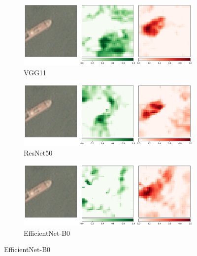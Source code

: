 \documentclass[11pt]{article}
\begin{document}
	\begin{figure}[H]
		\centering
		\caption{Occlusion-Based Attribution Maps}
		
		\begin{subfigure}[b]{0.45\textwidth}
			\centering
			\includegraphics[width=\linewidth]{assets/occlusion/vgg11_occlusion.png}
			\caption{VGG11}
		\end{subfigure}
		\hfill
		\begin{subfigure}[b]{0.45\textwidth}
			\centering
			\includegraphics[width=\linewidth]{assets/occlusion/resnet50_occlusion.png}
			\caption{ResNet50}
		\end{subfigure}

		
		\begin{subfigure}[b]{0.45\textwidth}
			\centering
			\includegraphics[width=\linewidth]{assets/occlusion/efficientnet_b0_occlusion.png}
			\caption{EfficientNet-B0}
		\end{subfigure}
	\end{figure}
	
\end{document}
